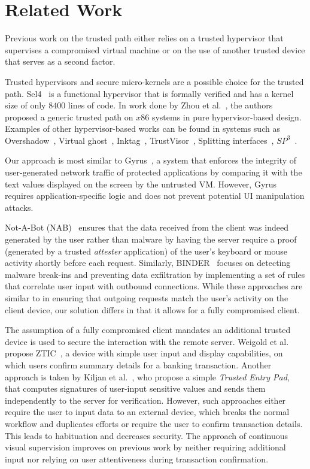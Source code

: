 \section{Related Work} 
\label{integriscreen:sec:relatedWork}

Previous work on the trusted path either relies on a trusted hypervisor that supervises a compromised virtual machine or on the use of another trusted device that serves as a second factor.

Trusted hypervisors and secure micro-kernels are a possible choice for the trusted path. Sel4~\cite{klein2009sel4} is a functional hypervisor that is formally verified and has a kernel size of only $8400$ lines of code. In work done by Zhou et al.~\cite{x86}, the authors proposed a generic trusted path on $x86$ systems in pure hypervisor-based design. Examples of other hypervisor-based works can be found in systems such as Overshadow~\cite{Overshadow}, Virtual ghost~\cite{criswell2014virtual}, Inktag~\cite{hofmann2013inktag}, TrustVisor~\cite{mccune2010trustvisor}, Splitting interfaces~\cite{ta2006splitting}, $SP^3$~\cite{yang2008using}.

Our approach is most similar to Gyrus~\cite{gyrus}, a system that enforces the integrity of user-generated network traffic of protected applications by comparing it with the text values displayed on the screen by the untrusted VM. However, Gyrus requires application-specific logic and does not prevent potential UI manipulation attacks.

Not-A-Bot (NAB)~\cite{nab} ensures that the data received from the client was indeed generated by the user rather than malware by having the server require a proof (generated by a trusted \emph{attester} application) of the user's keyboard or mouse activity shortly before each request.
Similarly, BINDER~\cite{binder} focuses on detecting malware break-ins and preventing data exfiltration by implementing a set of rules that correlate user input with outbound connections. While these approaches are similar to \sysname in ensuring that outgoing requests match the user's activity on the client device, our solution differs in that it allows for a fully compromised client.


The assumption of a fully compromised client mandates an additional trusted device is used to secure the interaction with the remote server.
Weigold et al. propose ZTIC~\cite{weigold2011}, a device with simple user input and display capabilities, on which users confirm summary details for a banking transaction. Another approach is taken by Kiljan et al.~\cite{6978928}, who propose a simple \emph{Trusted Entry Pad}, that computes signatures of user-input sensitive values and sends them independently to the server for verification. However, such approaches either require the user to input data to an external device, which breaks the normal workflow and duplicates efforts or require the user to confirm transaction details. This leads to habituation and decreases security. The approach of continuous visual supervision improves on previous work by neither requiring additional input nor relying on user attentiveness during transaction confirmation.